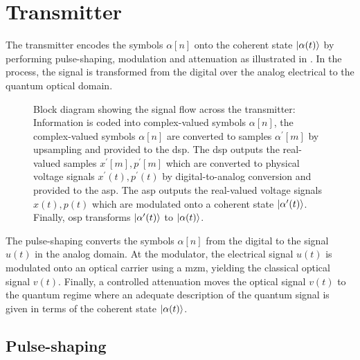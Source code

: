 \section{Transmitter}                                                                                                                                                                                                                                                                                                                                                                                                                                                                                                                                                                                                                                                                                                                     

The transmitter encodes the symbols $\alpha[n]$ onto the coherent state $\ket{\alpha(t)}$ by performing pulse-shaping, modulation and attenuation as illustrated in .
In the process, the signal is transformed from the digital over the analog electrical to the quantum optical domain.
\begin{figure}[htb]
	\centering
	
	\caption{Block diagram showing the signal flow across the transmitter: Information is coded into complex-valued symbols $\alpha[n]$, the complex-valued symbols $\alpha[n]$ are converted to samples $\alpha^\prime[m]$ by upsampling and provided to the \gls{dsp}. The \gls{dsp} outputs the real-valued samples $x^\prime[m],p^\prime[m]$ which are converted to physical voltage signals $x^\prime(t),p^\prime(t)$ by digital-to-analog conversion and provided to the \gls{asp}. The \gls{asp} outputs the real-valued voltage signals $x(t),p(t)$ which are modulated onto a coherent state $\ket{\alpha^\prime(t)}$. Finally, \gls{osp} transforms $\ket{\alpha^\prime(t)}$ to $\ket{\alpha(t)}$.}\label{fig:transmitter}
\end{figure}
The pulse-shaping converts the symbols $\alpha[n]$ from the digital to the signal $u(t)$ in the analog domain.
At the modulator, the electrical signal $u(t)$ is modulated onto an optical carrier using a \gls{mzm}, yielding the classical optical signal $v(t)$.
Finally, a controlled attenuation moves the optical signal $v(t)$ to the quantum regime where an adequate description of the quantum signal is given in terms of the coherent state $\ket{\alpha(t)}$.

\subsection{Pulse-shaping}

